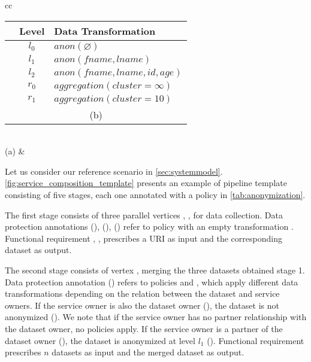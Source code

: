 \begin{table*}[ht!]
{\begin{tabular}[t]{cc}
      \begin{tabular}[t]{c|c|l}
        \textbf{\tp{i}} & \textbf{Level} & \textbf{Data Transformation}                      \\\hline
        \tp{0}          & $l_0$          & $anon(\varnothing)$                               \\
        \tp{1}          & $l_1$          & $anon(fname, lname)$                              \\
        \tp{2}          & $l_2$          & $anon(fname, lname, id, age)$                     \\
        \tp{3}          & $r_0$          & $aggregation(cluster=\infty)                    $ \\
        \tp{4}          & $r_1$          & $aggregation(cluster=10)                       $  \\
        \multicolumn{3}{c}{\footnotesize (b)}
      \end{tabular} \\
      \footnotesize (a) &                                                                                          \\
    \end{tabular}
  }
\end{table*}
Let us consider our reference scenario in \cref{sec:systemmodel}.
\cref{fig:service_composition_template} presents an example of pipeline template consisting of five stages, each one annotated with a policy in \cref{tab:anonymization}.

The first stage consists of three parallel vertices , ,  for data collection.
Data protection annotations \myLambda(), \myLambda(), \myLambda() refer to policy  with an empty transformation .
Functional requirement , ,   prescribes a URI as input and the corresponding dataset as output.

The second stage consists of vertex ,
merging the three datasets obtained stage 1. Data protection annotation \myLambda() refers to policies  and , which apply different data transformations depending on the relation between the dataset and service owners.
If the service owner is also the dataset owner (\pone), the dataset is not anonymized (). We note that if the service owner has no partner relationship with the dataset owner, no policies apply.
If the service owner is a partner of the dataset owner (\ptwo), the dataset is anonymized at level $l_1$ ().
Functional requirement  prescribes $n$ datasets as input and the merged dataset as output.

